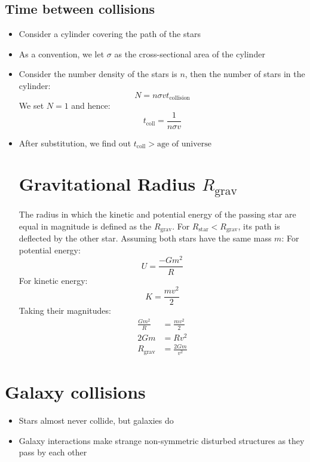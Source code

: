\documentclass{article}
\begin{document}
\subsection{Time between collisions}
\begin{itemize}
\item Consider a cylinder covering the path of the stars
\item As a convention, we let $\sigma$ as the cross-sectional area of the cylinder
\item Consider the number density of the stars is $n$, then the number of stars in the cylinder:
\begin{equation}
N=n \sigma vt_\text{collision}
\end{equation}
We set $N=1$ and hence:
\begin{equation}
t_\text{coll}=\frac{1}{n \sigma v}
\end{equation}
\item After substitution, we find out $t_\text{coll} > \text{age of universe}$
\section{Gravitational Radius $R_\text{grav}$}
The radius in which the kinetic and potential energy of the passing star are equal in magnitude is defined as the $R_\text{grav}$. For $R_\text{star}<R_\text{grav} $, its path is deflected by the other star. Assuming both stars have the same mass $m$:
For potential energy:
\begin{equation}
U=\frac{-Gm^2}{R}
\end{equation}
For kinetic energy:
\begin{equation}
K=\frac{mv^2}{2}
\end{equation}
Taking their magnitudes:
\begin{align}
\frac{Gm^2}{R}&=\frac{mv^2}{2}\\
2Gm&=Rv^2\\
R_\text{grav}&=\frac{2Gm}{v^2}
\end{align}
\end{itemize}
\section{Galaxy collisions}
\begin{itemize}
\item Stars almost never collide, but galaxies do
\item Galaxy interactions make strange non-symmetric disturbed structures as they pass by each other
\end{itemize}
\end{document}
